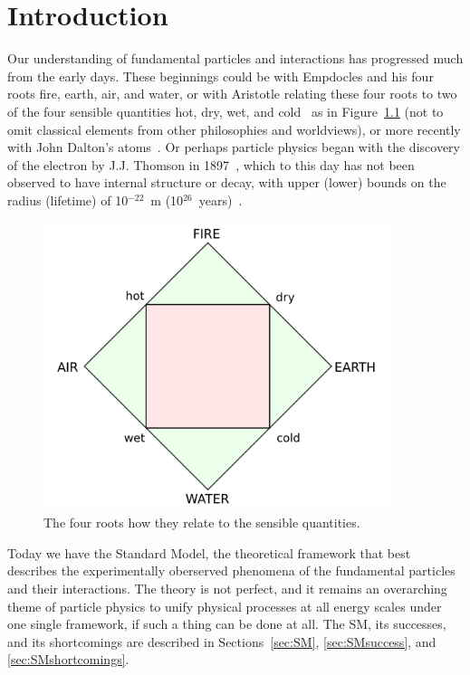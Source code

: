 
\chapter{Introduction\label{ch:intro}}

Our understanding of fundamental particles and interactions has progressed much from the early days.
These beginnings could be with Empdocles and his four roots fire, earth, air, and water, or with
Aristotle relating these four roots to two of the four sensible quantities hot, dry, wet, and
cold~\cite{0415078547} as in Figure~\ref{fig:aristotle}
(not to omit classical elements from other philosophies and worldviews), or more recently with
John Dalton's atoms~\cite{dalton}. Or perhaps particle physics began with
the discovery of the electron by J.J. Thomson in 1897~\cite{thomson:electron},
which to this day has not been observed
to have internal structure or decay, with upper (lower) bounds on the radius (lifetime) of
10$^{-22}$~m (10$^{26}$~years)~\cite{1988PhST...22..102D,2002PhLB..525...29B}.

\begin{figure}[ht]
 \begin{center}
    \includegraphics[width=0.90\textwidth]{figures/intro/Four_elements_representation.png}
      \end{center}
\caption{The four roots how they relate to the sensible quantities.}
\label{fig:aristotle}
\end{figure}

Today we have the Standard Model, the theoretical framework that best describes the
experimentally oberserved phenomena of the fundamental particles and their interactions. The theory
is not perfect, and it remains an overarching theme of particle physics to unify physical processes
at all energy scales under one single framework, if such a thing can be done at all.
The SM, its successes, and its shortcomings are described in
Sections~\ref{sec:SM}, \ref{sec:SMsuccess}, and \ref{sec:SMshortcomings}.

